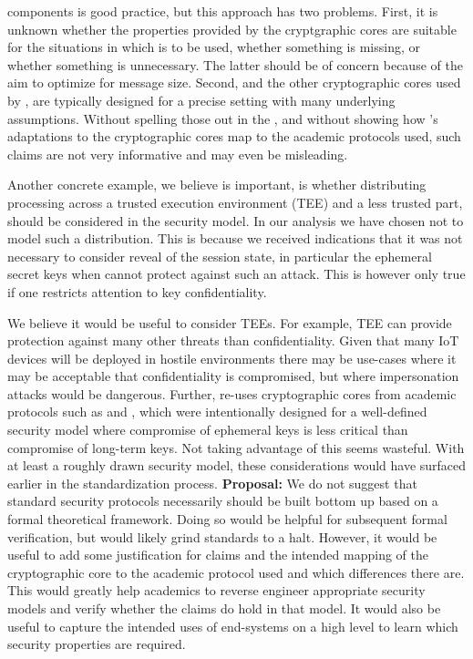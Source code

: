 \documentclass[runningheads,draft]{llncs}
\begin{document}
components is good practice, but this approach has two problems.
%
First, it is unknown whether the properties provided by the cryptgraphic cores
are suitable for the situations in which \mEdhoc{} is to be used, whether
something is missing, or whether something is unnecessary.
%
The latter should be of concern because of the aim to optimize \mEdhoc{} for
message size.
%
Second, \mSigma{} and the other cryptographic cores used by \mEdhoc, are
typically designed for a precise setting with many underlying assumptions.
%
Without spelling those out in the \mSpec, and without showing how
\mEdhoc's adaptations to the cryptographic cores map to the academic protocols
used, such claims are not very informative and may even be misleading.
%

Another concrete example, we believe is important, is whether distributing
\mEdhoc{} processing across a trusted execution environment (TEE) and a less
trusted part, should be considered in the security model.
%
In our analysis we have chosen not to model such a distribution.
%
This is because we received indications that it was not necessary to consider
reveal of the session state, in particular the ephemeral secret keys when
\mSigma{} cannot protect against such an attack.
%
This is however only true if one restricts attention to key confidentiality.
%

We believe it would be useful to consider TEEs.
%
For example, TEE can provide protection against many other threats than
confidentiality.
%
Given that many IoT devices will be deployed in hostile environments there may
be use-cases where it may be acceptable that confidentiality is compromised, but
where impersonation attacks would be dangerous.
%
Further, \mEdhoc{} re-uses cryptographic cores from academic protocols such as
\mSigma{} and \mOptls, which were intentionally designed for a well-defined
security model where compromise of ephemeral keys is less critical than
compromise of long-term keys.
%
Not taking advantage of this seems wasteful.
%
With at least a roughly drawn security model, these considerations would have
surfaced earlier in the standardization process.
%
\textbf{Proposal:} We do not suggest that standard security protocols
necessarily should be built bottom up based on a formal theoretical framework.
%
Doing so would be helpful for subsequent formal verification, but would
likely grind standards to a halt.
%
However, it would be useful to add some justification for claims and the
intended mapping of the cryptographic core to the academic protocol used and
which differences there are.
%
This would greatly help academics to reverse engineer appropriate security
models and verify whether the claims do hold in that model.
%
It would also be useful to capture the intended uses of end-systems on a high
level to learn which security properties are required.
%
\end{document}
